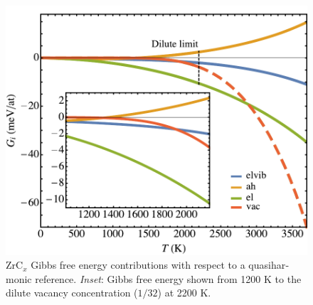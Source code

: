 \documentclass[twocolumn,american,aps,prb,showpacs,showkeys,amsmath,amssymb,superscriptaddress,a4]{revtex4-1}
\begin{document}
\begin{figure}[h]
\begin{centering}
\includegraphics[scale=0.55]{Fig8_freeEnergyContributionsRelQhaInset}
\par\end{centering}
\caption{\foreignlanguage{american}{ZrC\protect$_x$ Gibbs free energy contributions with
respect to a quasiharmonic reference. \emph{Inset}: Gibbs free energy
shown from 1200 K to the dilute vacancy concentration ($1/32$) at
2200 K. \label{fig: freeEnergyContributionsRelQhaInset}}}
\end{figure}
\end{document}
